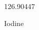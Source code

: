 \documentclass[12pt]{article}
\begin{document}
\hfill{}
\vfill
\begin{center}
  {\fontsize{50}{60}
  }

  126.90447

Iodine
\end{center}
\vfill
\end{document}
